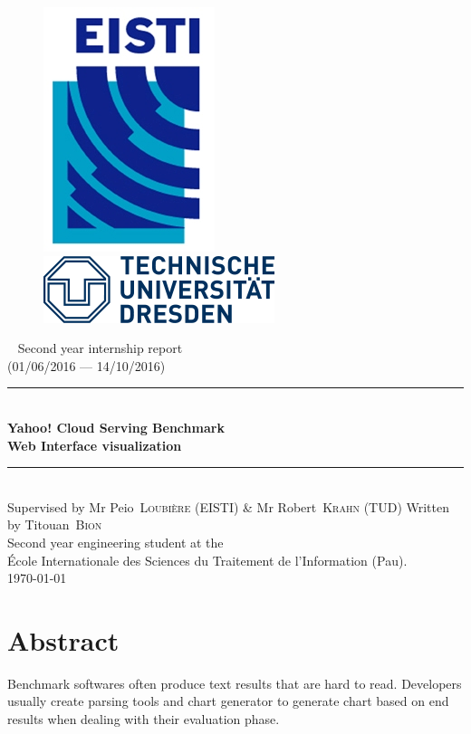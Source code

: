 \documentclass[a4paper,11pt]{report}
\newcommand*{\HRule}{\rule{\linewidth}{0.4mm}}  %
\newcommand*{\auteur}[2]{\large #1~\textsc{#2}} %
\newcommand{\pretitre}{Second year internship report \\ (01/06/2016 --- 14/10/2016)}
\newcommand{\grostitre}{Yahoo! Cloud Serving Benchmark \\ Web Interface visualization}
\newcommand{\auteurs}{Written by \auteur{Titouan}{Bion} \\ Second year engineering student at the \\ École Internationale des Sciences du Traitement de l'Information (Pau).}
\newcommand{\correcteurs}{Supervised by Mr \auteur{Peio}{Loubière} (EISTI) \& Mr \auteur{Robert}{Krahn} (TUD)}
\newcommand{\madate}{\today} %
\begin{document}


\begin{titlepage}
\begin{figure}[h]
\includegraphics[scale=1]{images/Logo_EISTI.png}
\hfill
\includegraphics[scale=0.6]{images/Logo_TUD.png}
\end{figure}
  \begin{center}
    ~
    \vfill
    {\Large\pretitre\\}           %
    \vspace{2cm}
    \HRule \\[0.4cm]
    {\Huge\bf\grostitre\\[0.4cm]} %
    \HRule \\[0.4cm]
    \vspace{2cm}
   	\correcteurs
    \medskip
    \vfill
    \auteurs\\                    %
    \vfill
    {\large\madate}               %
  \end{center}
\end{titlepage}

\chapter*{Abstract}

Benchmark softwares often produce text results that are hard to read. Developers usually create parsing tools and chart generator to generate chart based on end results when dealing with their evaluation phase.
\end{document}
